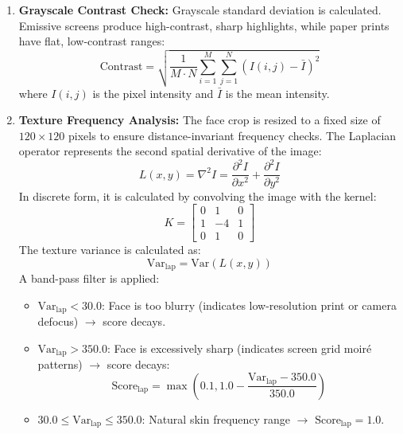 \begin{enumerate}
    \item \textbf{Grayscale Contrast Check:} Grayscale standard deviation is calculated. Emissive screens produce high-contrast, sharp highlights, while paper prints have flat, low-contrast ranges:
    \begin{equation}
        \text{Contrast} = \sqrt{\frac{1}{M \cdot N} \sum_{i=1}^M \sum_{j=1}^N \left( I(i, j) - \bar{I} \right)^2}
    \end{equation}
    where $I(i, j)$ is the pixel intensity and $\bar{I}$ is the mean intensity.
    \item \textbf{Texture Frequency Analysis:} The face crop is resized to a fixed size of $120 \times 120$ pixels to ensure distance-invariant frequency checks. The Laplacian operator represents the second spatial derivative of the image:
    \begin{equation}
        L(x, y) = \nabla^2 I = \frac{\partial^2 I}{\partial x^2} + \frac{\partial^2 I}{\partial y^2}
    \end{equation}
    In discrete form, it is calculated by convolving the image with the kernel:
    \begin{equation}
        K = \begin{bmatrix} 0 & 1 & 0 \\ 1 & -4 & 1 \\ 0 & 1 & 0 \end{bmatrix}
    \end{equation}
    The texture variance is calculated as:
    \begin{equation}
        \text{Var}_{\text{lap}} = \text{Var}(L(x, y))
    \end{equation}
    A band-pass filter is applied:
    \begin{itemize}
        \item $\text{Var}_{\text{lap}} < 30.0$: Face is too blurry (indicates low-resolution print or camera defocus) $\rightarrow$ score decays.
        \item $\text{Var}_{\text{lap}} > 350.0$: Face is excessively sharp (indicates screen grid moir\'{e} patterns) $\rightarrow$ score decays:
        \begin{equation}
            \text{Score}_{\text{lap}} = \max\left(0.1, 1.0 - \frac{\text{Var}_{\text{lap}} - 350.0}{350.0}\right)
        \end{equation}
        \item $30.0 \le \text{Var}_{\text{lap}} \le 350.0$: Natural skin frequency range $\rightarrow$ $\text{Score}_{\text{lap}} = 1.0$.

\end{itemize}
\end{enumerate}
